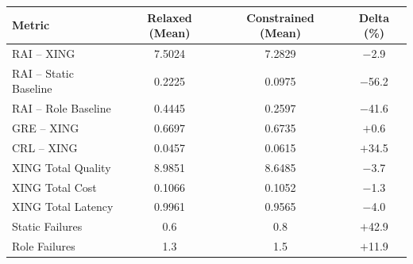 \begin{tabular}{lccc}
\toprule
Metric & Relaxed (Mean) & Constrained (Mean) & Delta (\%) \\
\midrule
RAI -- XING & 7.5024 & 7.2829 & $-$2.9 \\
RAI -- Static Baseline & 0.2225 & 0.0975 & $-$56.2 \\
RAI -- Role Baseline & 0.4445 & 0.2597 & $-$41.6 \\
GRE -- XING & 0.6697 & 0.6735 & $+$0.6 \\
CRL -- XING & 0.0457 & 0.0615 & $+$34.5 \\
XING Total Quality & 8.9851 & 8.6485 & $-$3.7 \\
XING Total Cost & 0.1066 & 0.1052 & $-$1.3 \\
XING Total Latency & 0.9961 & 0.9565 & $-$4.0 \\
Static Failures & 0.6 & 0.8 & $+$42.9 \\
Role Failures & 1.3 & 1.5 & $+$11.9 \\
\bottomrule
\end{tabular}
